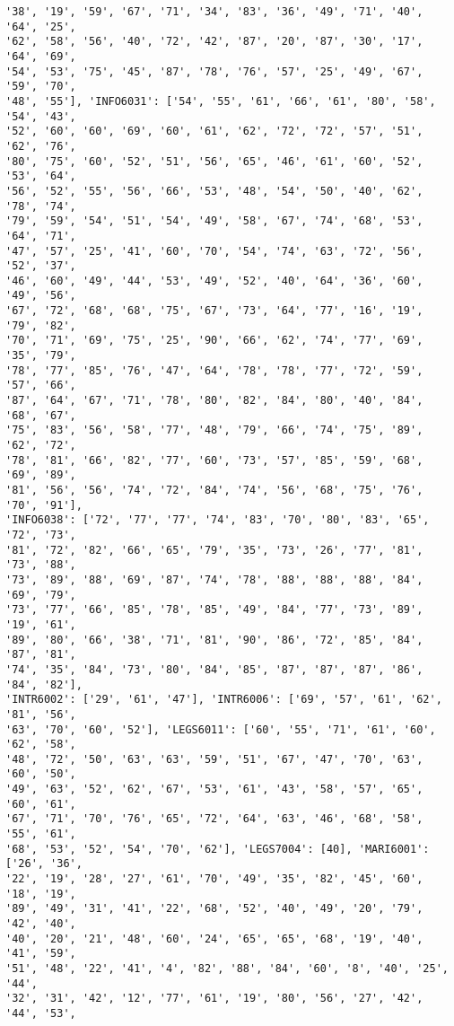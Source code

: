 \documentclass[11pt]{article}
\begin{document}
\begin{Verbatim}[commandchars=\\\{\}]
'38', '19', '59', '67', '71', '34', '83', '36', '49', '71', '40', '64', '25',
'62', '58', '56', '40', '72', '42', '87', '20', '87', '30', '17', '64', '69',
'54', '53', '75', '45', '87', '78', '76', '57', '25', '49', '67', '59', '70',
'48', '55'], 'INFO6031': ['54', '55', '61', '66', '61', '80', '58', '54', '43',
'52', '60', '60', '69', '60', '61', '62', '72', '72', '57', '51', '62', '76',
'80', '75', '60', '52', '51', '56', '65', '46', '61', '60', '52', '53', '64',
'56', '52', '55', '56', '66', '53', '48', '54', '50', '40', '62', '78', '74',
'79', '59', '54', '51', '54', '49', '58', '67', '74', '68', '53', '64', '71',
'47', '57', '25', '41', '60', '70', '54', '74', '63', '72', '56', '52', '37',
'46', '60', '49', '44', '53', '49', '52', '40', '64', '36', '60', '49', '56',
'67', '72', '68', '68', '75', '67', '73', '64', '77', '16', '19', '79', '82',
'70', '71', '69', '75', '25', '90', '66', '62', '74', '77', '69', '35', '79',
'78', '77', '85', '76', '47', '64', '78', '78', '77', '72', '59', '57', '66',
'87', '64', '67', '71', '78', '80', '82', '84', '80', '40', '84', '68', '67',
'75', '83', '56', '58', '77', '48', '79', '66', '74', '75', '89', '62', '72',
'78', '81', '66', '82', '77', '60', '73', '57', '85', '59', '68', '69', '89',
'81', '56', '56', '74', '72', '84', '74', '56', '68', '75', '76', '70', '91'],
'INFO6038': ['72', '77', '77', '74', '83', '70', '80', '83', '65', '72', '73',
'81', '72', '82', '66', '65', '79', '35', '73', '26', '77', '81', '73', '88',
'73', '89', '88', '69', '87', '74', '78', '88', '88', '88', '84', '69', '79',
'73', '77', '66', '85', '78', '85', '49', '84', '77', '73', '89', '19', '61',
'89', '80', '66', '38', '71', '81', '90', '86', '72', '85', '84', '87', '81',
'74', '35', '84', '73', '80', '84', '85', '87', '87', '87', '86', '84', '82'],
'INTR6002': ['29', '61', '47'], 'INTR6006': ['69', '57', '61', '62', '81', '56',
'63', '70', '60', '52'], 'LEGS6011': ['60', '55', '71', '61', '60', '62', '58',
'48', '72', '50', '63', '63', '59', '51', '67', '47', '70', '63', '60', '50',
'49', '63', '52', '62', '67', '53', '61', '43', '58', '57', '65', '60', '61',
'67', '71', '70', '76', '65', '72', '64', '63', '46', '68', '58', '55', '61',
'68', '53', '52', '54', '70', '62'], 'LEGS7004': [40], 'MARI6001': ['26', '36',
'22', '19', '28', '27', '61', '70', '49', '35', '82', '45', '60', '18', '19',
'89', '49', '31', '41', '22', '68', '52', '40', '49', '20', '79', '42', '40',
'40', '20', '21', '48', '60', '24', '65', '65', '68', '19', '40', '41', '59',
'51', '48', '22', '41', '4', '82', '88', '84', '60', '8', '40', '25', '44',
'32', '31', '42', '12', '77', '61', '19', '80', '56', '27', '42', '44', '53',

\end{Verbatim}
\end{document}
